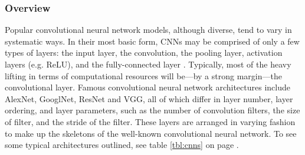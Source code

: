 \subsubsection{Overview}
Popular convolutional neural network models, although diverse, tend to vary in systematic ways. In their most basic form, CNNs may be comprised of only a few types of layers: the input layer, the convolution, the pooling layer, activation layers (e.g. ReLU), and the fully-connected layer \cite{convnets}. Typically, most of the heavy lifting in terms of computational resources will be---by a strong margin---the convolutional layer. Famous convolutional neural network architectures include AlexNet, GooglNet, ResNet and VGG, all of which differ in layer number, layer ordering, and layer parameters, such as the number of convolution filters, the size of filter, and the stride of the filter. These layers are arranged in varying fashion to make up the skeletons of the well-known convolutional neural network. To see some typical architectures outlined, see table \ref{tbl:cnns} on page \pageref{tbl:cnns}.

